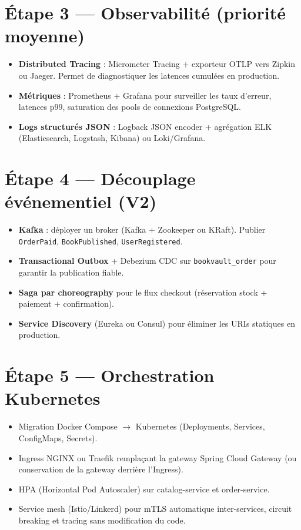 \documentclass[12pt,a4paper]{report}
\begin{document}
\section{Étape 3 — Observabilité (priorité moyenne)}
\begin{itemize}
  \item \textbf{Distributed Tracing} : Micrometer Tracing + exporteur OTLP vers Zipkin ou Jaeger. Permet de diagnostiquer les latences cumulées en production.
  \item \textbf{Métriques} : Prometheus + Grafana pour surveiller les taux d'erreur, latences p99, saturation des pools de connexions PostgreSQL.
  \item \textbf{Logs structurés JSON} : Logback JSON encoder + agrégation ELK (Elasticsearch, Logstash, Kibana) ou Loki/Grafana.
\end{itemize}

\section{Étape 4 — Découplage événementiel (V2)}
\begin{itemize}
  \item \textbf{Kafka} : déployer un broker (Kafka + Zookeeper ou KRaft). Publier \texttt{OrderPaid}, \texttt{BookPublished}, \texttt{UserRegistered}.
  \item \textbf{Transactional Outbox} + Debezium CDC sur \texttt{bookvault\_order} pour garantir la publication fiable.
  \item \textbf{Saga par choreography} pour le flux checkout (réservation stock + paiement + confirmation).
  \item \textbf{Service Discovery} (Eureka ou Consul) pour éliminer les URIs statiques en production.
\end{itemize}

\section{Étape 5 — Orchestration Kubernetes}
\begin{itemize}
  \item Migration Docker Compose $\rightarrow$ Kubernetes (Deployments, Services, ConfigMaps, Secrets).
  \item Ingress NGINX ou Traefik remplaçant la gateway Spring Cloud Gateway (ou conservation de la gateway derrière l'Ingress).
  \item HPA (Horizontal Pod Autoscaler) sur catalog-service et order-service.
  \item Service mesh (Istio/Linkerd) pour mTLS automatique inter-services, circuit breaking et tracing sans modification du code.
\end{itemize}
\end{document}
